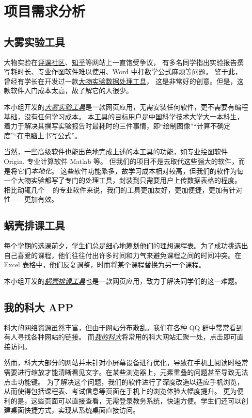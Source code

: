 \section{项目需求分析}

\subsection{大雾实验工具}

大物实验在\href{https://icourse.club/course/12716/}{评课社区}、\href{https://www.zhihu.com/question/35867101}{知乎}等网站上一直饱受争议，
有多名同学指出实验报告撰写耗时长、专业作图软件难以使用、Word 中打数学公式麻烦等问题。
鉴于此，曾经有学长在开发过一款\href{https://github.com/regymm/PhysicsExp}{大物实验数据处理工具}，
这是非常好的创意。但是，这款软件入门成本太高，故了解它的人很少。

本小组开发的\href{https://dawu.feixu.site/}{\emph{大雾实验工具}}是一款网页应用，无需安装任何软件，更不需要有编程基础，没有任何学习成本。
本工具的目标用户是中国科学技术大学大一本科生，着力于解决其撰写实验报告时最耗时的三件事情，即“绘制图像”“计算不确定度”“在电脑上书写公式”。

当然，一些高级软件也能出色地完成上述的本工具的功能，如专业绘图软件 Origin, 专业计算软件 Matlab 等。
但我们的项目不是去取代这些强大的软件，而是将它们\emph{本地化}。
这些软件功能繁多，故学习成本相对较高，但我们的软件为每一个大物实验都写了专门的处理工具，封装到只需要用户上传数据表格的程度。
相比动辄几个 \unit{\giga\byte} 的专业软件来说，我们的工具更加友好，更加便捷，更加有针对性——更加有效。

\subsection{蜗壳排课工具}

每个学期的选课前夕，学生们总是细心地筹划他们的理想课程表。为了成功挑选出自己喜爱的课程，他们往往付出许多时间和力气来避免课程之间的时间冲突。在 Excel 表格中，他们反复调整，时而将某个课程替换为另一个课程。

本小组开发的\href{https://paike.feixu.site/}{\emph{蜗壳排课工具}}也是一款网页应用，致力于解决同学们的这一难题。

\subsection{我的科大 APP}

科大的网络资源虽然丰富，但由于网站分布散乱。我们在各种 QQ 群中常常看到有人寻找各种网站的链接。
而\href{https://myustc.feixu.site/}{\emph{我的科大}}将常用的科大网站汇聚一处，点击即可直接访问。

然而，科大大部分的网站并未针对小屏幕设备进行优化，导致在手机上阅读时经常需要进行缩放才能清晰看见文字。在某些浏览器上，元素重叠的问题甚至导致无法点击功能键。
为了解决这个问题，我们的软件进行了深度改造以适应手机浏览，从而使得包括课程表、考试信息等页面在手机上的浏览体验大幅度提升。
更为便利的是，这些页面可以直接查看，无需登录教务系统，快速方便。学生们还可以创建桌面快捷方式，实现从系统桌面直接访问。